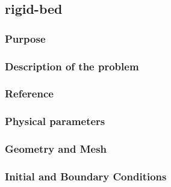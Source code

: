 \subsection{rigid-bed}
%

%
\subsubsection{Purpose}
%

%
\subsubsection{Description of the problem}
%

%
%
\subsubsection{Reference}
%

%
%
\subsubsection{Physical parameters}
%

%
%
\subsubsection{Geometry and Mesh}
%

%
%
\subsubsection{Initial and Boundary Conditions}
%

%
%
